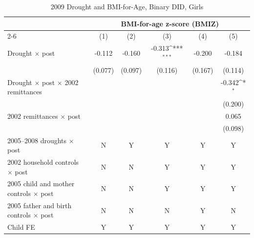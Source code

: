 \documentclass[12pt]{article}
\def\sym#1{\ifmmode^{#1}\else\(^{#1}\)\fi}
\begin{document}
\begin{longtable}{l*{5}{c}}
\caption{2009 Drought and BMI-for-Age, Binary DID, Girls}\\
\toprule
 & \multicolumn{5}{c}{BMI-for-age z-score (BMIZ)}\\
\cmidrule(lr){2-6}
            &\multicolumn{1}{c}{(1)}         &\multicolumn{1}{c}{(2)}         &\multicolumn{1}{c}{(3)}         &\multicolumn{1}{c}{(4)}         &\multicolumn{1}{c}{(5)}         \\
\midrule
Drought \ensuremath{\times} post&      -0.112         &      -0.160         &      -0.313\sym{***}&      -0.200         &      -0.184         \\
            &     (0.077)         &     (0.097)         &     (0.116)         &     (0.167)         &     (0.114)         \\
Drought \ensuremath{\times} post \ensuremath{\times} 2002 remittances&                     &                     &                     &                     &      -0.342\sym{*}  \\
            &                     &                     &                     &                     &     (0.200)         \\
2002 remittances \ensuremath{\times} post&                     &                     &                     &                     &       0.065         \\
            &                     &                     &                     &                     &     (0.098)         \\
\midrule
2005--2008 droughts \ensuremath{\times} post&           N         &           Y         &           Y         &           Y         &           Y         \\
2002 household controls \ensuremath{\times} post&           N         &           N         &           Y         &           Y         &           Y         \\
2005 child and mother controls \ensuremath{\times} post&           N         &           N         &           Y         &           Y         &           Y         \\
2005 father and birth controls \ensuremath{\times} post&           N         &           N         &           N         &           Y         &           N         \\
Child FE    &           Y         &           Y         &           Y         &           Y         &           Y         \\

\end{longtable}
\end{document}
